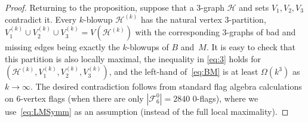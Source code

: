 \documentclass[11pt,a4paper]{article}
\theoremstyle{remark}
\newcommand{\C}[1]{\mathcal{#1}}
\newcommand{\I}[1]{{\mathbbm #1}}
\newcommand{\hide}[1]{}
\begin{document}
\begin{proof}


Returning to the proposition, suppose that a $3$-graph $\C H$ and sets $V_1,V_2,V_3$ contradict it. Every $k$-blowup $\C H^{(k)}$ has the natural vertex $3$-partition, $V_1^{(k)}\cup V_2^{(k)}\cup V_3^{(k)}=V(\C H^{(k)})$ 
with the corresponding 3-graphs of bad and missing edges being exactly the $k$-blowups of $B$ and~$M$. It is easy to check that this partition is also locally maximal, the inequality in \eqref{eq:3} holds for $(\C H^{(k)},V_1^{(k)},V_2^{(k)},V_3^{(k)})$, and the left-hand of~\eqref{eq:BM} is at least $\Omega(k^3)$ as $k\to\infty$. The desired contradiction  follows from standard flag algebra calculations on 6-vertex flags (when there are only $|\C F_6^0|=2840$ 0-flags), where we use~\eqref{eq:LMSymm} as an assumption (instead of the full local maximality). \hide{Our implementation of this theory was to use three unary relations (working with the complete 3-partite graph $F$ implicitly defined by them), as this was easier to implement given how we represent flags on computer.}
\end{proof}
\end{document}
